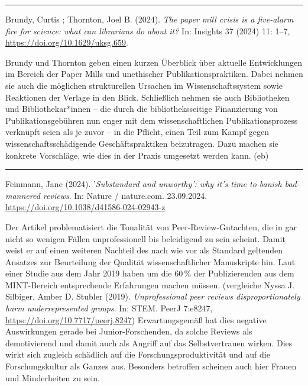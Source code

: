 \documentclass[a4paper,
fontsize=11pt,
oneside,
numbers=noperiodatend,
parskip=half-,
bibliography=totoc,
final
]{scrartcl}
\begin{document}
\begin{center}\rule{0.5\linewidth}{0.5pt}\end{center}

Brundy, Curtis ; Thornton, Joel B. (2024). \emph{The paper mill crisis
is a five-alarm fire for science: what can librarians do about it?} In:
Insights 37 (2024) 11: 1--7, \url{https://doi.org/10.1629/uksg.659}.

Brundy und Thornton geben einen kurzen Überblick über aktuelle
Entwicklungen im Bereich der Paper Mills und unethischer
Publikationspraktiken. Dabei nehmen sie auch die möglichen strukturellen
Ursachen im Wissenschaftssystem sowie Reaktionen der Verlage in den
Blick. Schließlich nehmen sie auch Bibliotheken und Bibliothekar*innen
-- die durch die bibliotheksseitige Finanzierung von
Publikationsgebühren nun enger mit dem wissenschaftlichen
Publikationsprozess verknüpft seien als je zuvor -- in die Pflicht,
einen Teil zum Kampf gegen wissenschaftsschädigende Geschäftspraktiken
beizutragen. Dazu machen sie konkrete Vorschläge, wie dies in der Praxis
umgesetzt werden kann. (eb)

\begin{center}\rule{0.5\linewidth}{0.5pt}\end{center}

Feinmann, Jane (2024). '\emph{Substandard and unworthy': why it's time
to banish bad-mannered reviews}. In: Nature / nature.com. 23.09.2024.
\url{https://doi.org/10.1038/d41586-024-02943-z}

Der Artikel problematisiert die Tonalität von Peer-Review-Gutachten, die
in gar nicht so wenigen Fällen unprofessionell bis beleidigend zu sein
scheint. Damit weist er auf einen weiteren Nachteil des nach wie vor als
Standard geltenden Ansatzes zur Beurteilung der Qualität
wissenschaftlicher Manuskripte hin. Laut einer Studie aus dem Jahr 2019
haben um die 60\,\% der Publizierenden aus dem MINT-Bereich
entsprechende Erfahrungen machen müssen. (vergleiche Nyssa J. Silbiger,
Amber D. Stubler (2019). \emph{Unprofessional peer reviews
disproportionately harm underrepresented groups}. In: STEM. PeerJ
7:e8247, \url{https://doi.org/10.7717/peerj.8247}) Erwartungsgemäß hat
dies negative Auswirkungen gerade bei Junior-Forschenden, da solche
Reviews als demotivierend und damit auch als Angriff auf das
Selbstvertrauen wirken. Dies wirkt sich zugleich schädlich auf die
Forschungsproduktivität und auf die Forschungskultur als Ganzes aus.
Besonders betroffen scheinen auch hier Frauen und Minderheiten zu sein.
\end{document}
